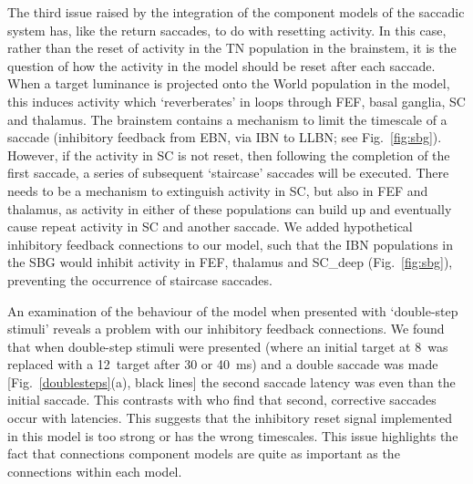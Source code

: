 \documentclass{frontiersSCNS}
\begin{document}
The third issue raised by the integration of the component models of
the saccadic system has, like the return saccades, to do with
resetting activity. In this case, rather than the reset of activity in
the TN population in the brainstem, it is the question of how the
activity in the  model should be reset after each
saccade. When a target luminance is projected onto the World
population in the model, this induces activity which `reverberates' in
loops through FEF, basal ganglia, SC and thalamus. The brainstem
contains a mechanism to limit the timescale of a saccade (inhibitory
feedback from EBN, via IBN to LLBN; see Fig.~\ref{fig:sbg}). However, if
the activity in SC is not reset, then following the completion of the
first saccade, a series of subsequent `staircase' saccades will be
executed. There needs to be a mechanism to extinguish activity in SC,
but also in FEF and thalamus, as activity in either of these
populations can build up and eventually cause repeat activity in SC
and another saccade. We added hypothetical inhibitory feedback
connections to our model, such that the IBN populations in the SBG
would inhibit activity in FEF, thalamus and SC\_deep (Fig.~\ref{fig:sbg}),
preventing the occurrence of staircase saccades.

An examination of the behaviour of the model when presented with
`double-step stimuli' reveals a problem with our inhibitory feedback
connections. We found that when double-step stimuli were presented (where
an initial target at 8\dg~was replaced with a 12\dg~target after 30 or
40~ms) and a double saccade was made [Fig.~\ref{doublesteps}(a), black
lines] the second saccade latency was  even than the initial
saccade. This contrasts with \cite{becker_analysis_1979} who find that
second, corrective saccades occur with  latencies.  This
suggests that the inhibitory reset signal implemented in this model is
too strong or has the wrong timescales. This issue highlights the fact
that connections  component models are quite as important
as the connections within each model.
\end{document}

